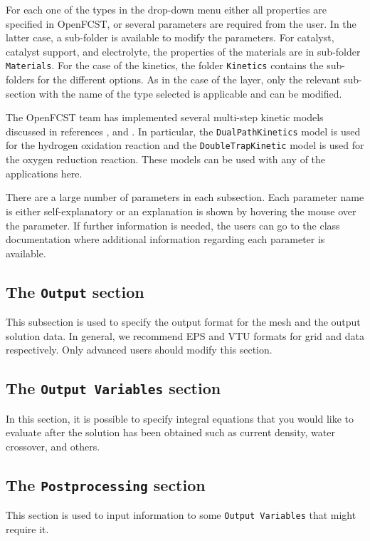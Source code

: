 For each one of the types in the drop-down menu either all properties are specified in OpenFCST, or several parameters are required from the user. In the latter case, a sub-folder is available to modify the parameters. For catalyst, catalyst support, and electrolyte, the properties of the materials are in sub-folder \texttt{Materials}. For the case of the kinetics, the folder \texttt{Kinetics} contains the sub-folders for the different options. As in the case of the layer, only the relevant sub-section with the name of the type selected is applicable and can be modified.

The OpenFCST team has implemented several multi-step kinetic models discussed in references \cite{Secanell08}, \cite{Moore13} and \cite{Secanell14}. In particular, the \texttt{DualPathKinetics} model is used for the hydrogen oxidation reaction and the \texttt{DoubleTrapKinetic} model is used for the oxygen reduction reaction. These models can be used with any of the applications here.

There are a large number of parameters in each subsection. Each parameter name is either self-explanatory or an explanation is shown by hovering the mouse over the parameter. If further information is needed, the users can go to the class documentation where additional information regarding each parameter is available.

\subsection{The \texttt{Output} section}
This subsection is used to specify the output format for the mesh and the output solution data. In general, we recommend EPS and VTU formats for grid and data respectively. Only advanced users should modify this section.

\subsection{The \texttt{Output Variables} section}
In this section, it is possible to specify integral equations that you would like to evaluate after the solution has been obtained such as current density, water crossover, and others. 

\subsection{The \texttt{Postprocessing} section}
This section is used to input information to some \texttt{Output Variables} that might require it.


